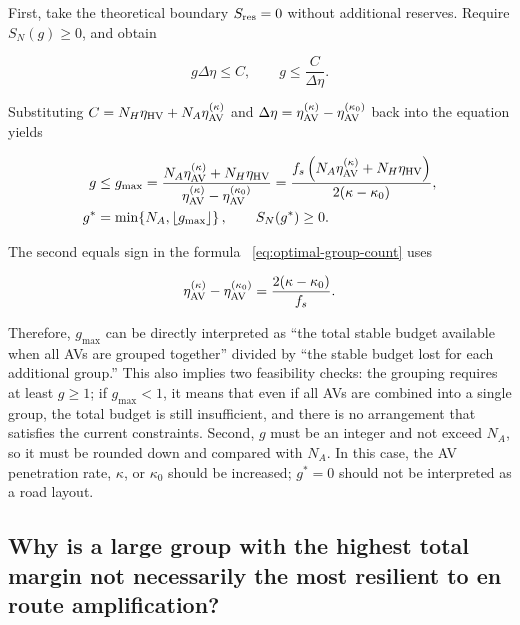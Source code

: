 \documentclass[11pt,a4paper,openany]{book}
\numberwithin{equation}{chapter}
\numberwithin{figure}{chapter}
\numberwithin{table}{chapter}
\begin{document}
First, take the theoretical boundary $S_{\rm res}=0$ without additional reserves. Require $S_N(g)\ge0$, and obtain

\[
g\Delta\eta\le C,
\qquad
g\le\frac{C}{\Delta\eta}.
\]

Substituting $C=N_H\eta_{\rm HV}+N_A\eta_{\rm AV}^{(\kappa)}$ and $\Delta\eta=\eta_{\rm AV}^{(\kappa)}-\eta_{\rm AV}^{(\kappa_0)}$ back into the equation yields







\begin{tcolorbox}[keybox,title=\textbf{Upper Bound on the Number of Groups and Integer Feasible Solutions}]
\begin{align}
g&\le g_{\max}
=\frac{N_A\eta_{\rm AV}^{(\kappa)}+N_H\eta_{\rm HV}}
{\eta_{\rm AV}^{(\kappa)}-\eta_{\rm AV}^{(\kappa_0)}}
=\frac{f_s\left(N_A\eta_{\rm AV}^{(\kappa)}+N_H\eta_{\rm HV}\right)}
{2(\kappa-\kappa_0)}, \\
g^*&=\min\!\left\{N_A,\left\lfloor g_{\max}\right\rfloor\right\},
\qquad S_N(g^*)\ge0.
\label{eq:optimal-group-count}
\end{align}
\end{tcolorbox}


The second equals sign in the formula ~\eqref{eq:optimal-group-count} uses

\[
\eta_{\rm AV}^{(\kappa)}-\eta_{\rm AV}^{(\kappa_0)}
=\frac{2(\kappa-\kappa_0)}{f_s}.
\]

Therefore, $g_{\max}$ can be directly interpreted as “the total stable budget available when all AVs are grouped together” divided by “the stable budget lost for each additional group.” This also implies two feasibility checks: the grouping requires at least $g\ge1$; if $g_{\max}<1$, it means that even if all AVs are combined into a single group, the total budget is still insufficient, and there is no arrangement that satisfies the current constraints. Second, $g$ must be an integer and not exceed $N_A$, so it must be rounded down and compared with $N_A$. In this case, the AV penetration rate, $\kappa$, or $\kappa_0$ should be increased; $g^*=0$ should not be interpreted as a road layout.










\subsection{Why is a large group with the highest total margin not necessarily the most resilient to en route amplification?}
\end{document}
